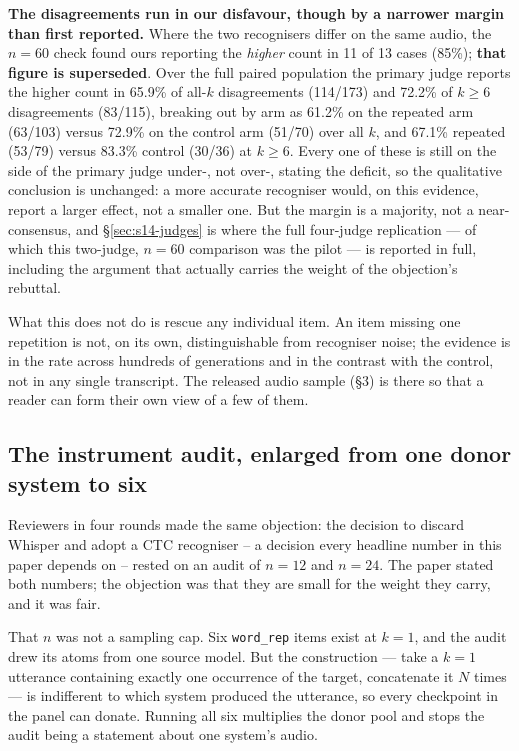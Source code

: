 \documentclass[11pt]{article}
\begin{document}
\noindent\textbf{The disagreements run in our disfavour, though by a narrower
margin than first reported.} Where the two recognisers differ on the same
audio, the $n{=}60$ check found ours reporting the \emph{higher} count in 11 of
13 cases (85\%); \textbf{that figure is superseded}. Over the full paired
population the primary judge reports the higher count in 65.9\% of all-$k$
disagreements (114/173) and 72.2\% of $k\ge6$ disagreements (83/115), breaking
out by arm as 61.2\% on the repeated arm (63/103) versus 72.9\% on the control
arm (51/70) over all $k$, and 67.1\% repeated (53/79) versus 83.3\% control
(30/36) at $k\ge6$. Every one of these is still on the side of the primary
judge under-, not over-, stating the deficit, so the qualitative conclusion is
unchanged: a more accurate recogniser would, on this evidence, report a larger
effect, not a smaller one. But the margin is a majority, not a near-consensus,
and \S\ref{sec:s14-judges} is where the full four-judge replication --- of
which this two-judge, $n{=}60$ comparison was the pilot --- is reported in
full, including the argument that actually carries the weight of the
objection's rebuttal.

What this does not do is rescue any individual item. An item missing one
repetition is not, on its own, distinguishable from recogniser noise; the
evidence is in the rate across hundreds of generations and in the contrast with
the control, not in any single transcript. The released audio sample (\S3) is
there so that a reader can form their own view of a few of them.

\subsection{The instrument audit, enlarged from one donor system to six}
\label{sec:s14-enlarged}

Reviewers in four rounds made the same objection: the decision to discard Whisper
and adopt a CTC recogniser -- a decision every headline number in this paper
depends on -- rested on an audit of $n{=}12$ and $n{=}24$. The paper stated both
numbers; the objection was that they are small for the weight they carry, and it
was fair.

That $n$ was not a sampling cap. Six \texttt{word\_rep} items exist at $k{=}1$,
and the audit drew its atoms from one source model. But the construction --- take
a $k{=}1$ utterance containing exactly one occurrence of the target, concatenate
it $N$ times --- is indifferent to which system produced the utterance, so every
checkpoint in the panel can donate. Running all six multiplies the donor pool and
stops the audit being a statement about one system's audio.
\end{document}
